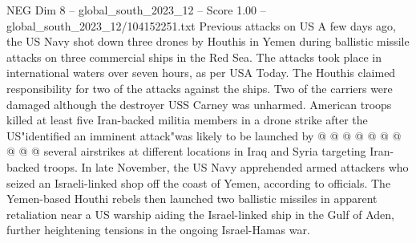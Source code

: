 \begin{textsample}{NEG Dim 8 – global\_south\_2023\_12 – Score 1.00 – global\_south\_2023\_12/104152251.txt}
Previous attacks on US A few days ago, the US Navy shot down three drones by Houthis in Yemen during ballistic missile attacks on three commercial ships in the Red Sea.
The attacks took place in international waters over seven hours, as per USA Today.
The Houthis claimed responsibility for two of the attacks against the ships.
Two of the carriers were damaged although the destroyer USS Carney was unharmed.
American troops killed at least five Iran-backed militia members in a drone strike after the US"identified an imminent attack"was likely to be launched by @ @ @ @ @ @ @ @ @ @ several airstrikes at different locations in Iraq and Syria targeting Iran-backed troops.
In late November, the US Navy apprehended armed attackers who seized an Israeli-linked shop off the coast of Yemen, according to officials.
The Yemen-based Houthi rebels then launched two ballistic missiles in apparent retaliation near a US warship aiding the Israel-linked ship in the Gulf of Aden, further heightening tensions in the ongoing Israel-Hamas war.

\end{textsample}
